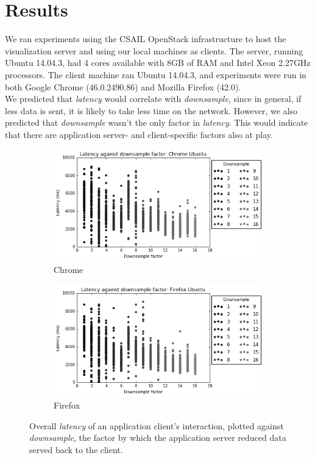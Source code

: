 \section{Results}\label{visgoth-ch:results}

We ran experiments using the CSAIL OpenStack infrastructure to host the
visualization server and using our local machines as clients. The server,
running Ubuntu 14.04.3, had 4 cores available with 8GB of RAM and Intel Xeon
2.27GHz processors. The client machine ran Ubuntu 14.04.3, and experiments were
run in both Google Chrome (46.0.2490.86) and Mozilla Firefox (42.0). \\

We predicted that \emph{latency} would correlate with \emph{downsample}, since
in general, if less data is sent, it is likely to take less time on the
network. However, we also predicted that \emph{downsample} wasn't the only
factor in \emph{latency}. This would indicate that there are application
server- and client-specific factors also at play.

  \begin{figure}[h]
  \begin{center}
  \begin{subfigure}{0.49\textwidth}
    \includegraphics[width=\textwidth]{./img/chrome-extent.png}
    \caption{Chrome}
  \end{subfigure}
  \begin{subfigure}{0.49\textwidth}
    \includegraphics[width=\textwidth]{./img/firefox-extent.png}
    \caption{Firefox}
  \end{subfigure}
  \caption{Overall \emph{latency} of an application client's interaction,
      plotted against \emph{downsample}, the factor by which the application
      server reduced data served back to the client.}
  \label{fig:extent}
  \end{center}
  \end{figure}

